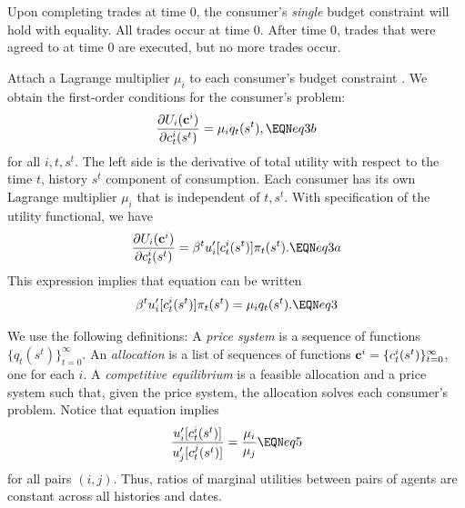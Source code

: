 Upon completing trades at time $0$, the consumer's
{\it single\/} budget constraint  will hold
with equality. 
All trades occur at time $0$.  After time $0$, trades that
were agreed to at time $0$ are executed, but no more trades occur.


Attach a Lagrange multiplier $\mu_i$ to each consumer's  budget constraint  .
We obtain the
first-order conditions for the consumer's problem:
$$  {\partial U_i({\bf c}^i) \over \partial c_t^i(s^t)} = \mu_i q_t(s^t), \EQN eq3b $$
for all $i, t, s^t$.
The left side is the derivative of total utility with respect to
the time $t$, history $s^t$ component of consumption.  Each
consumer has its own Lagrange multiplier $\mu_i$ that is independent of $t, s^t$. With specification  of the utility functional,
we have
$$ {\partial U_i({\bf c}^i) \over \partial c_t^i(s^t)} =   \beta^t
 u'_i[c_t^i(s^t)] \pi_t(s^t) .  \EQN eq3a $$
This expression  implies that equation  can be written
$$ \beta^t u'_i[c_t^i(s^t)] \pi_t(s^t) = \mu_i q_t(s^t). \EQN eq3 $$


We use the following  definitions:
\medskip
{}   A {\it price system} is a sequence of
functions $\{q_t(s^t)\}_{t=0}^\infty$.  An {\it allocation} is
a list of sequences of functions ${\bf c}^i=\{c_t^i(s^t)\}_{t=0}^\infty$,
 one for each $i$.
\medskip
{} A {\it competitive equilibrium} is
a feasible allocation and a price system such that, given
the price system,  the allocation solves
each consumer's problem.
\medskip
Notice that equation  implies
$$ {u'_i[c_t^i(s^t)] \over
 u'_j[c_t^j(s^t)] }
 = {\mu_i\over \mu_j}          \EQN eq5 $$
for all pairs $(i,j)$.
Thus, ratios of marginal utilities between pairs of agents are
constant across all histories and dates.


